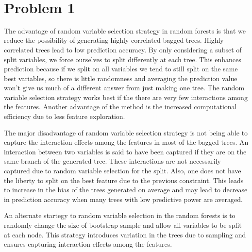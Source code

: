 \documentclass[11pt]{article}
\begin{document}
\begin{center}

\ \\
\end{center}

\section*{Problem 1}

\vspace{5 mm}
\noindent
The advantage of random variable selection strategy in random forests is that
we reduce the possibility of generating highly correlated bagged trees. Highly
correlated trees lead to low prediction accuracy. By only considering a subset 
of split variables, we force ourselves to split differently at each tree. This 
enhances prediction because if we split on all variables we tend to still split
on the same best variables, so there is little randomness and averaging the 
prediction value won't give us much of a different answer from just making
one tree. The random variable selection strategy works best if the there are 
very few interactions among the features. Another advantage of the method is 
the increased computational efficiency due to less feature exploration. 

The major disadvantage of random variable selection strategy is not being able to 
capture the interaction effects among the features in most of the bagged trees. An 
interaction between two variables is said to have been captured if they are on the same
branch of the generated tree. These interactions are not necessarily captured 
due to random variable selection for the split. Also, one does not have the liberty 
to split on the best feature due to the previous constraint. This leads to increase
in the bias of the trees generated on average and may lead to decrease in 
prediction accuracy when many trees with low predictive power are averaged.

An alternate startegy to random variable selection in the random forests is to 
randomly change the size of bootstrap sample and allow all variables to be split at 
each node. This strategy introduces variation in the trees due to sampling and 
ensures capturing interaction effects among the features. 


\vspace{5 mm}
\noindent
\end{document}
